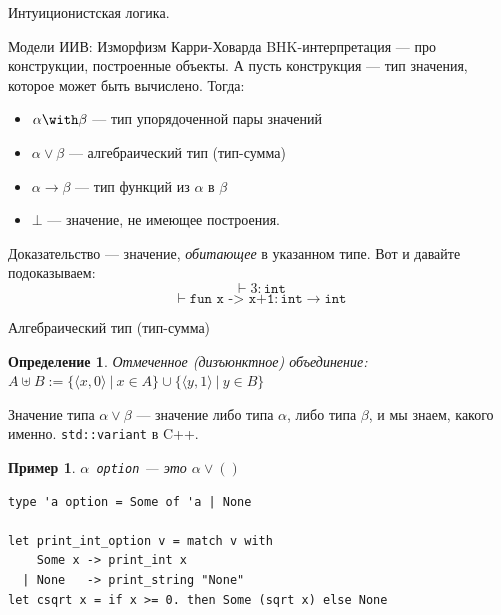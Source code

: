 \documentclass[aspectratio=169]{beamer}
\begin{document}
\newtheorem{axiom}{Аксиома}
\newtheorem{exmprus}{Пример}
\newtheorem{defrus}{Определение}
\newtheorem{lemmarus}{Лемма}
\newtheorem{thmrus}{Теорема}


\begin{frame}{}
\begin{center}\Large Интуиционистская логика.\end{center}
\end{frame}

\begin{frame}{Модели ИИВ: Изморфизм Карри-Ховарда}
BHK-интерпретация --- про конструкции, построенные объекты. А пусть конструкция --- тип значения,
которое может быть вычислено. Тогда:

\begin{itemize}
\item $\alpha\with\beta$ --- тип упорядоченной пары значений
\item $\alpha\vee\beta$ --- алгебраический тип (тип-сумма)
\item $\alpha\rightarrow\beta$ --- тип функций из $\alpha$ в $\beta$
\item $\bot$ --- значение, не имеющее построения.
\end{itemize}

Доказательство --- значение, \emph{обитающее} в указанном типе. Вот и давайте подоказываем:
$$\vdash 3 : \texttt{int}$$
$$\vdash \texttt{fun x -> x+1} : \texttt{int}\rightarrow\texttt{int}$$
\end{frame}

\begin{frame}[fragile]{Алгебраический тип (тип-сумма)}
\begin{defrus}Отмеченное (дизъюнктное) объединение: $A \uplus B := \{ \langle x, 0 \rangle\ |\ x \in A\} \cup \{ \langle y, 1\rangle\ |\ y \in B\}$\end{defrus}

Значение типа $\alpha\vee\beta$ --- значение либо типа $\alpha$, либо типа $\beta$, и мы знаем, какого именно. \verb!std::variant! в C++.

\begin{exmprus}$\alpha$\verb! option! --- это $\alpha\vee()$\end{exmprus}

\begin{verbatim}
type 'a option = Some of 'a | None

let print_int_option v = match v with
    Some x -> print_int x
  | None   -> print_string "None"
let csqrt x = if x >= 0. then Some (sqrt x) else None
\end{verbatim}

\end{frame}
\end{document}
